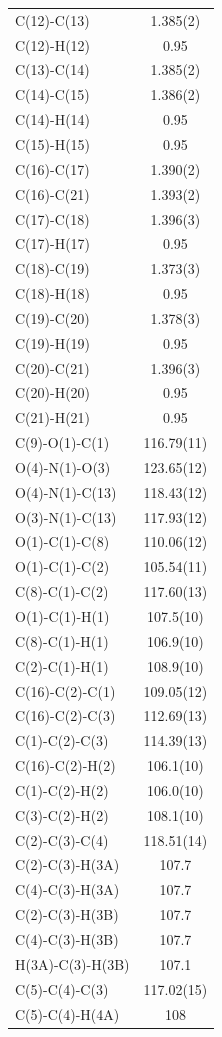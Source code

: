 \begin{center}
{\begin{supertabular}{p{1.5in}c}
C(12)-C(13)&1.385(2)\\
C(12)-H(12)&0.95\\
C(13)-C(14)&1.385(2)\\
C(14)-C(15)&1.386(2)\\
C(14)-H(14)&0.95\\
C(15)-H(15)&0.95\\
C(16)-C(17)&1.390(2)\\
C(16)-C(21)&1.393(2)\\
C(17)-C(18)&1.396(3)\\
C(17)-H(17)&0.95\\
C(18)-C(19)&1.373(3)\\
C(18)-H(18)&0.95\\
C(19)-C(20)&1.378(3)\\
C(19)-H(19)&0.95\\
C(20)-C(21)&1.396(3)\\
C(20)-H(20)&0.95\\
C(21)-H(21)&0.95\\
C(9)-O(1)-C(1)&116.79(11)\\
O(4)-N(1)-O(3)&123.65(12)\\
O(4)-N(1)-C(13)&118.43(12)\\
O(3)-N(1)-C(13)&117.93(12)\\
O(1)-C(1)-C(8)&110.06(12)\\
O(1)-C(1)-C(2)&105.54(11)\\
C(8)-C(1)-C(2)&117.60(13)\\
O(1)-C(1)-H(1)&107.5(10)\\
C(8)-C(1)-H(1)&106.9(10)\\
C(2)-C(1)-H(1)&108.9(10)\\
C(16)-C(2)-C(1)&109.05(12)\\
C(16)-C(2)-C(3)&112.69(13)\\
C(1)-C(2)-C(3)&114.39(13)\\
C(16)-C(2)-H(2)&106.1(10)\\
C(1)-C(2)-H(2)&106.0(10)\\
C(3)-C(2)-H(2)&108.1(10)\\
C(2)-C(3)-C(4)&118.51(14)\\
C(2)-C(3)-H(3A)&107.7\\
C(4)-C(3)-H(3A)&107.7\\
C(2)-C(3)-H(3B)&107.7\\
C(4)-C(3)-H(3B)&107.7\\
H(3A)-C(3)-H(3B)&107.1\\
C(5)-C(4)-C(3)&117.02(15)\\
C(5)-C(4)-H(4A)&108\\

\end{supertabular}}
\end{center}
